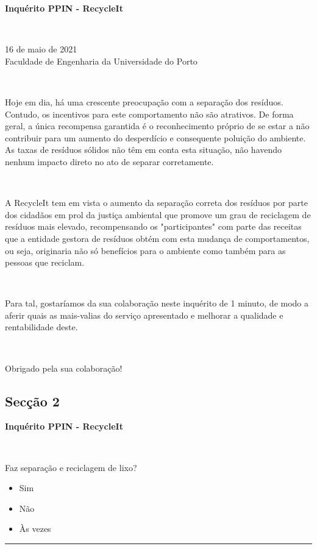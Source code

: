 \documentclass[11pt, a4paper, oneside]{book}
\begin{document}
\begin{appendices}
\begin{mdframed}[innerleftmargin=7.5mm, innerrightmargin=7.5mm, innertopmargin=7.5mm, innerbottommargin=7.5mm]
\setlength{\parindent}{0pt}

{\Large \textbf{Inquérito PPIN - RecycleIt}}

~

16 de maio de 2021 \\
Faculdade de Engenharia da Universidade do Porto

~

Hoje em dia, há uma crescente preocupação com a separação dos resíduos. Contudo, os incentivos para este comportamento não são atrativos. De forma geral, a única recompensa garantida é o reconhecimento próprio de se estar a não contribuir para um aumento do desperdício e consequente poluição do ambiente. As taxas de resíduos sólidos não têm em conta esta situação, não havendo nenhum impacto direto no ato de separar corretamente.

~

A RecycleIt tem em vista o aumento da separação correta dos resíduos por parte dos cidadãos em prol da justiça ambiental que promove um grau de reciclagem de resíduos mais elevado, recompensando os "participantes" com parte das receitas que a entidade gestora de resíduos obtém com esta mudança de comportamentos, ou seja, originaria não só benefícios para o ambiente como também para as pessoas que reciclam.

~

Para tal, gostaríamos da sua colaboração neste inquérito de 1 minuto, de modo a aferir quais as mais-valias do serviço apresentado e melhorar a qualidade e rentabilidade deste.

~

Obrigado pela sua colaboração!
\end{mdframed}

\newpage

\subsection{Secção 2}

\setlength{\parindent}{0pt}

\begin{mdframed}[innerleftmargin=7.5mm, innerrightmargin=7.5mm, innertopmargin=7.5mm, innerbottommargin=7.5mm]

{\Large \textbf{Inquérito PPIN - RecycleIt}}

~

Faz separação e reciclagem de lixo?
\begin{itemize}[label={\huge $\circ$}]
    \itemsep0em
    \item Sim
    \item Não
    \item Às vezes
\end{itemize}
\vspace{-0.7em}\rule{\linewidth}{0.5pt}\vspace{0.5em}


\end{mdframed}
\end{appendices}
\end{document}
